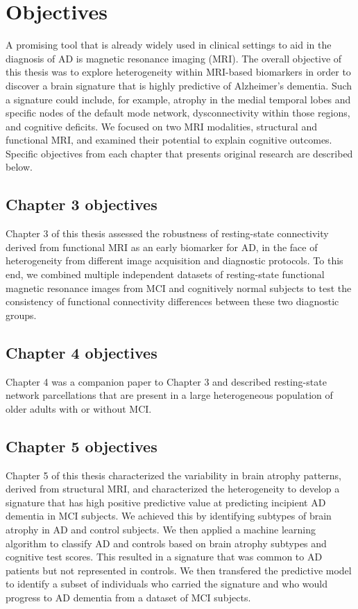 \section{Objectives}

A promising tool that is already widely used in clinical settings to aid in the diagnosis of AD is magnetic resonance imaging (MRI). The overall objective of this thesis was to explore heterogeneity within MRI-based biomarkers in order to discover a brain signature that is highly predictive of Alzheimer's dementia. Such a signature could include, for example, atrophy in the medial temporal lobes and specific nodes of the default mode network, dysconnectivity within those regions, and cognitive deficits. We focused on two MRI modalities, structural and functional MRI, and examined their potential to explain cognitive outcomes. Specific objectives from each chapter that presents original research are described below.

\subsection*{Chapter 3 objectives}
Chapter 3 of this thesis assessed the robustness of resting-state connectivity derived from functional MRI as an early biomarker for AD, in the face of heterogeneity from different image acquisition and diagnostic protocols. To this end, we combined multiple independent datasets of resting-state functional magnetic resonance images from MCI and cognitively normal subjects to test the consistency of functional connectivity differences between these two diagnostic groups.  

\subsection*{Chapter 4 objectives}
Chapter 4 was a companion paper to Chapter 3 and described resting-state network parcellations that are present in a large heterogeneous population of older adults with or without MCI. 

\subsection*{Chapter 5 objectives}
Chapter 5 of this thesis characterized the variability in brain atrophy patterns, derived from structural MRI, and characterized the heterogeneity to develop a signature that has high positive predictive value at predicting incipient AD dementia in MCI subjects. We achieved this by identifying subtypes of brain atrophy in AD and control subjects. We then applied a machine learning algorithm to classify AD and controls based on brain atrophy subtypes and cognitive test scores. This resulted in a signature that was common to AD patients but not represented in controls. We then transfered the predictive model to identify a subset of individuals who carried the signature and who would progress to AD dementia from a dataset of MCI subjects.



